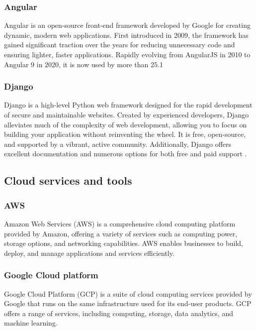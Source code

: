 \subsubsection{Angular}

Angular is an open-source front-end framework developed by Google for creating dynamic, modern web applications. First introduced in 2009, the framework has gained significant traction over the years for reducing unnecessary code and ensuring lighter, faster applications. Rapidly evolving from AngularJS in 2010 to Angular 9 in 2020, it is now used by more than 25.1%

\subsubsection{Django}
Django is a high-level Python web framework designed for the rapid development of secure and maintainable websites. Created by experienced developers, Django alleviates much of the complexity of web development, allowing you to focus on building your application without reinventing the wheel. It is free, open-source, and supported by a vibrant, active community. Additionally, Django offers excellent documentation and numerous options for both free and paid support \cite{django}.


\subsection{Cloud services and tools}
\subsubsection{AWS}
Amazon Web Services (AWS) is a comprehensive cloud computing platform provided by Amazon, offering a variety of services such as computing power, storage options, and networking capabilities. AWS enables businesses to build, deploy, and manage applications and services efficiently.

\subsubsection{Google Cloud platform}
Google Cloud Platform (GCP) is a suite of cloud computing services provided by Google that runs on the same infrastructure used for its end-user products. GCP offers a range of services, including computing, storage, data analytics, and machine learning.


